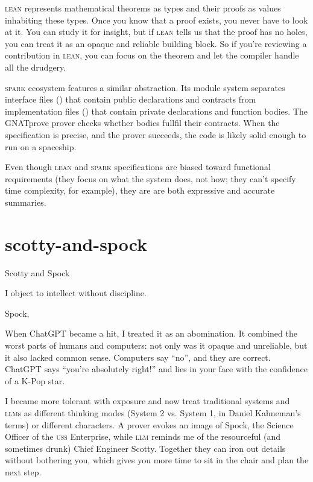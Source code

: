 \documentclass{article}
\begin{document}
\textsc{lean} represents mathematical theorems as types and their proofs as values inhabiting these types.
Once you know that a proof exists, you never have to look at it.
You can study it for insight,
but if \textsc{lean} tells us that the proof has no holes,
you can treat it as an opaque and reliable building block.
So if you're reviewing a contribution in \textsc{lean},
you can focus on the theorem and let the compiler handle all the drudgery.

\textsc{spark} ecosystem features a similar abstraction.
Its module system separates interface files () that contain public declarations and contracts
from implementation files () that contain private declarations and function bodies.
The GNATprove prover checks whether bodies fullfil their contracts.
When the specification is precise, and the prover succeeds, the code is likely solid enough to run on a spaceship.

Even though \textsc{lean} and \textsc{spark} specifications are biased toward functional requirements
(they focus on what the system does, not how;
they can't specify time complexity, for example),
they are are both expressive and accurate summaries.

\section{scotty-and-spock}{Scotty and Spock}

\epigraph{I object to intellect without discipline.}{Spock, \cite{The Squire of Gothos}}

When ChatGPT became a hit, I treated it as an abomination.
It combined the worst parts of humans and computers:
not only was it opaque and unreliable, but it also lacked common sense.
Computers say ``no'', and they are correct.
ChatGPT says ``you're absolutely right!'' and lies in your face with the confidence of a K-Pop star.

I became more tolerant with exposure and now treat traditional systems and \textsc{llm}s as different thinking modes
(System 2 vs. System 1, in Daniel Kahneman's terms) or different characters.
A prover evokes an image of Spock, the Science Officer of the \textsc{uss} Enterprise,
while \textsc{llm} reminds me of the resourceful (and sometimes drunk) Chief Engineer Scotty.
Together they can iron out details without bothering you, which
gives you more time to sit in the chair and plan the next step.
\end{document}
